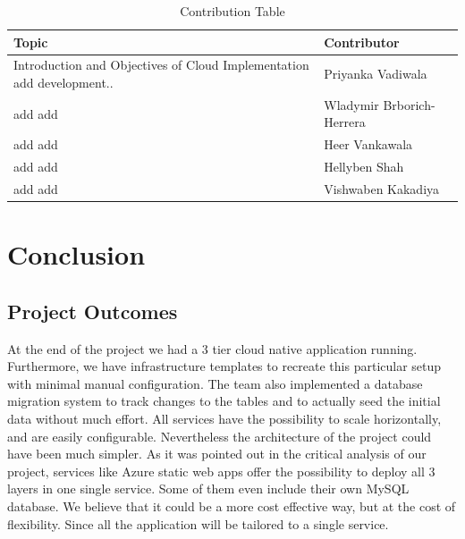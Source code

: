 \documentclass{llncs}
\begin{document}
\begin{table}[htbp]

    \begin{tabular}{|p{}|p{}|}
        \hline
        \textbf{Topic}                                                              & \textbf{Contributor}                   \\ 
        \hline
        Introduction and Objectives of Cloud Implementation  \newline                       
        add development..                                                           & Priyanka Vadiwala                      \\ 
        \hline
        add \newline
        add                                                                         & Wladymir Brborich-Herrera              \\ 
        \hline
        add \newline
        add                                                                         & Heer Vankawala                         \\ 
        \hline
        add \newline
        add                                                                         & Hellyben Shah                          \\ 
        \hline
        add \newline
        add                                                                         & Vishwaben Kakadiya                     \\ 
        \hline
    \end{tabular}
    \caption{Contribution Table}
    \label{tab:contribution}
\end{table}

\section{Conclusion}
\subsection{Project Outcomes}

At the end of the project we had a 3 tier cloud native application running.
Furthermore, we have infrastructure templates to recreate this particular setup with minimal manual configuration.
The team also implemented a database migration system to track changes to the tables and to actually seed the initial data without much effort.
All services have the possibility to scale horizontally, and are easily configurable. Nevertheless the architecture of the project could have been much simpler.
As it was pointed out in the critical analysis of our project, services like Azure static web apps offer the possibility to deploy all 3 layers in one single service.
Some of them even include their own MySQL database. We believe that it could be a more cost effective way, but at the cost of flexibility.
Since all the application will be tailored to a single service.
\end{document}
